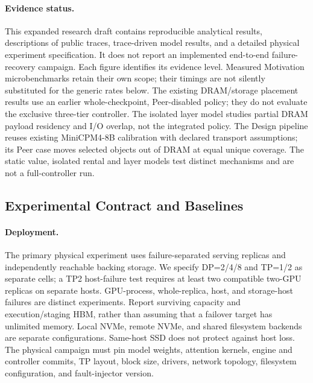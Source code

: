 \documentclass[sigplan,10pt,anonymous,nonacm]{acmart}
\begin{document}
\paragraph{Evidence status.}
This expanded research draft contains reproducible analytical results,
descriptions of public traces, trace-driven model results, and a detailed
physical experiment specification. It does not report an implemented
end-to-end failure-recovery campaign. Each figure identifies its evidence
level. Measured Motivation microbenchmarks retain their own scope;
their timings are not silently substituted for the generic rates below.
The existing DRAM/storage placement results use an earlier whole-checkpoint,
Peer-disabled policy; they do not evaluate the exclusive three-tier
controller. The isolated layer model studies partial DRAM payload
residency and I/O overlap, not the integrated policy. The Design pipeline
reuses existing MiniCPM4-8B calibration with declared transport assumptions;
its Peer case moves selected objects out of DRAM at equal unique coverage.
The static value, isolated rental and layer models test distinct mechanisms
and are not a full-controller run.

\FloatBarrier
\subsection{Experimental Contract and Baselines}
\label{sec:eval-method}

\paragraph{Deployment.}
The primary physical experiment uses failure-separated serving replicas
and independently reachable backing storage. We specify DP=2/4/8 and TP=1/2
as separate cells; a TP2 host-failure test requires at least two compatible
two-GPU replicas on separate hosts. GPU-process, whole-replica, host, and
storage-host failures are distinct experiments. Report surviving capacity
and execution/staging HBM, rather than assuming that a failover target has
unlimited memory. Local NVMe, remote NVMe, and shared filesystem backends
are separate configurations. Same-host SSD does not protect against host
loss. The physical campaign must pin model weights, attention kernels,
engine and controller commits, TP layout, block size, drivers, network
topology, filesystem configuration, and fault-injector version.
\end{document}
